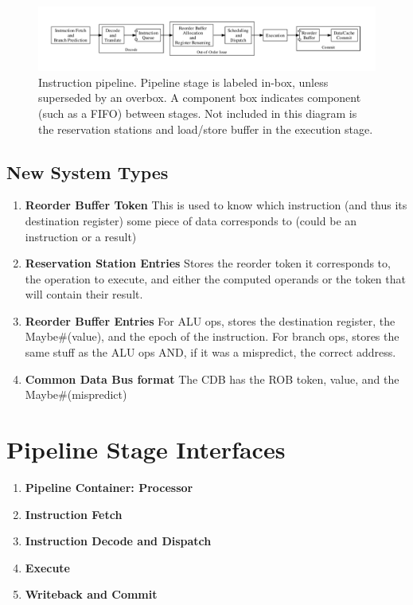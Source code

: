 \documentclass[12pt]{article}
\begin{document}
\begin{figure}[h]
    \centering
    \includegraphics[width=1.1\textwidth]{figures/pipeline.pdf}
    \caption{Instruction pipeline. Pipeline stage is labeled in-box, unless superseded by an overbox. A component box indicates component (such as a FIFO) between stages. Not included in this diagram is the reservation stations and load/store buffer in the execution stage.\label{fig:pipeline}}
\end{figure}

\subsection{New System Types}

\begin{enumerate}
    \item \textbf{Reorder Buffer Token}
This is used to know which instruction (and thus its destination register) some piece of data corresponds to (could be an instruction or a result)
    \item \textbf{Reservation Station Entries}
Stores the reorder token it corresponds to, the operation to execute, and either the computed operands or the token that will contain their result.
    \item \textbf{Reorder Buffer Entries}
For ALU ops, stores the destination register, the Maybe#(value), and the epoch of the instruction.
For branch ops, stores the same stuff as the ALU ops AND, if it was a mispredict, the correct address.
    \item \textbf{Common Data Bus format}
The CDB has the ROB token, value, and the Maybe#(mispredict)
\end{enumerate}

\section{Pipeline Stage Interfaces}

\begin{enumerate}
    \item \textbf{Pipeline Container: Processor}
    \item \textbf{Instruction Fetch}
    \item \textbf{Instruction Decode and Dispatch}
    \item \textbf{Execute}
    \item \textbf{Writeback and Commit}
\end{enumerate}
\end{document}
